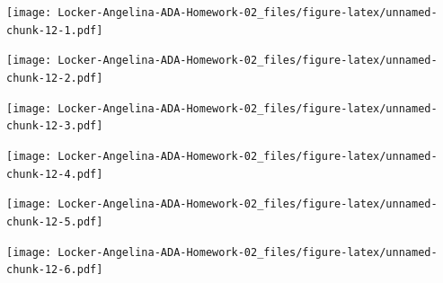 \documentclass[]{article}
\newenvironment{Shaded}{\begin{snugshade}}{\end{snugshade}}
\newcommand{\KeywordTok}[1]{\textcolor[rgb]{0.13,0.29,0.53}{\textbf{#1}}}
\newcommand{\DataTypeTok}[1]{\textcolor[rgb]{0.13,0.29,0.53}{#1}}
\newcommand{\StringTok}[1]{\textcolor[rgb]{0.31,0.60,0.02}{#1}}
\newcommand{\OperatorTok}[1]{\textcolor[rgb]{0.81,0.36,0.00}{\textbf{#1}}}
\newcommand{\NormalTok}[1]{#1}
\begin{document}
\texttt{[image: Locker-Angelina-ADA-Homework-02\_files/figure-latex/unnamed-chunk-12-1.pdf]}

\begin{Shaded}
\end{Shaded}

\texttt{[image: Locker-Angelina-ADA-Homework-02\_files/figure-latex/unnamed-chunk-12-2.pdf]}

\begin{Shaded}
\end{Shaded}

\texttt{[image: Locker-Angelina-ADA-Homework-02\_files/figure-latex/unnamed-chunk-12-3.pdf]}

\begin{Shaded}
\end{Shaded}

\texttt{[image: Locker-Angelina-ADA-Homework-02\_files/figure-latex/unnamed-chunk-12-4.pdf]}

\begin{Shaded}
\end{Shaded}

\texttt{[image: Locker-Angelina-ADA-Homework-02\_files/figure-latex/unnamed-chunk-12-5.pdf]}

\begin{Shaded}
\end{Shaded}

\texttt{[image: Locker-Angelina-ADA-Homework-02\_files/figure-latex/unnamed-chunk-12-6.pdf]}
\end{document}
